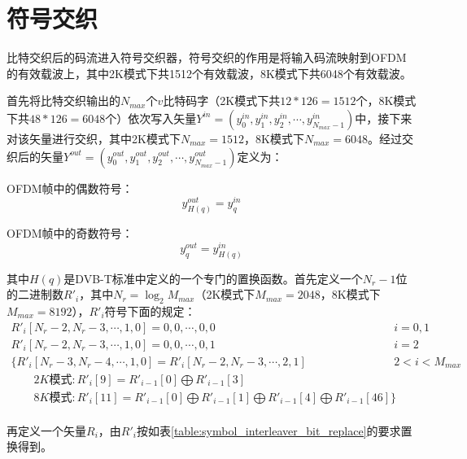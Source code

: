 	\section{符号交织}
		\par 比特交织后的码流进入符号交织器，符号交织的作用是将输入码流映射到OFDM的有效载波上，其中2K模式下共1512个有效载波，8K模式下共6048个有效载波。
		\par 首先将比特交织输出的$N_{max}$个$v$比特码字（2K模式下共$12*126=1512$个，8K模式下共$48*126=6048$个）依次写入矢量$Y^{in}=(y_0^{in},y_1^{in},y_2^{in},\cdots,y_{N_{max}-1}^{in})$中，接下来对该矢量进行交织，其中2K模式下$N_{max}=1512$，8K模式下$N_{max}=6048$。经过交织后的矢量$Y^{out}=(y_0^{out},y_1^{out},y_2^{out},\cdots,y_{N_{max}-1}^{out})$定义为：
		\par OFDM帧中的偶数符号：
		\begin{equation}
			y_{H(q)}^{out}=y_q^{in}
		\end{equation}
		\par OFDM帧中的奇数符号：
		\begin{equation}
			y_q^{out}=y_{H(q)}^{in}
		\end{equation}
		\par 其中$H(q)$是DVB-T标准中定义的一个专门的置换函数。首先定义一个$N_r-1$位的二进制数$R'_i$，其中$N_r=\log_{2}M_{max}$（2K模式下$M_{max}=2048$，8K模式下$M_{max}=8192$），$R'_i$符号下面的规定：
		\begin{equation}
			\begin{array}{ll}
				R'_i[N_r-2,N_r-3,\cdots,1,0]=0,0,\cdots,0,0                                                                       & i={0,1}     \\
				R'_i[N_r-2,N_r-3,\cdots,1,0]=0,0,\cdots,0,1                                                                       & i=2         \\
				\{R'_i[N_r-3,N_r-4,\cdots,1,0]=R'_i[N_r-2,N_r-3,\cdots,2,1]                                                       & 2<i<M_{max} \\
				\quad\quad 2K\text{模式}:R'_i[9]=R'_{i-1}[0]\bigoplus R'_{i-1}[3]                                               &             \\
				\quad\quad 8K\text{模式}:R'_i[11]=R'_{i-1}[0]\bigoplus R'_{i-1}[1]\bigoplus R'_{i-1}[4]\bigoplus R'_{i-1}[46]\} &             \\
			\end{array}
		\end{equation}
		\par 再定义一个矢量$R_i$，由$R'_i$按如表\ref{table:symbol_interleaver_bit_replace}的要求置换得到。
